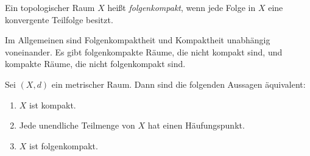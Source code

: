 \begin{definition}
Ein topologischer Raum $X$ heißt \emph{folgenkompakt}, wenn jede Folge in $X$ eine konvergente Teilfolge besitzt.
\end{definition}
Im Allgemeinen sind Folgenkompaktheit und Kompaktheit unabhängig voneinander. Es gibt folgenkompakte Räume, die nicht kompakt sind, und kompakte Räume, die nicht folgenkompakt sind.

\begin{theorem}
Sei $(X,d)$ ein metrischer Raum. Dann sind die folgenden Aussagen äquivalent:
\begin{enumerate}
\item $X$ ist kompakt.
\item Jede unendliche Teilmenge von $X$ hat einen Häufungspunkt.
\item $X$ ist folgenkompakt.
\end{enumerate}
\end{theorem}
